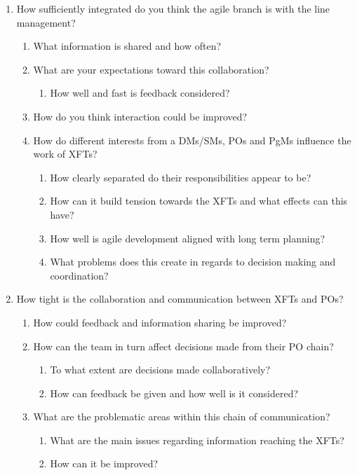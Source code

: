 \begin{enumerate}
  \item How sufficiently integrated do you think the agile branch is with the line management?
  
  \begin{enumerate}
     \item What information is shared and how often?
     \item What are your expectations toward this collaboration?
    
      \begin{enumerate}
       \item How well and fast is feedback considered?
       \end{enumerate}
      
    \item How do you think interaction could be improved?
    \item How do different interests from a DMs/SMs, POs and PgMs influence the work of XFTs?
    
      \begin{enumerate}
       \item How clearly separated do their responsibilities appear to be?
       \item How can it build tension towards the XFTs and what effects can this have?
       \item How well is agile development aligned with long term planning?
       \item What problems does this create in regards to decision making and coordination?
       \end{enumerate}
  \end{enumerate}

  \item How tight is the collaboration and communication between XFTs and POs?
  
  \begin{enumerate}
     \item How could feedback and information sharing be improved?
     \item How can the team in turn affect decisions made from their PO chain?
      
        \begin{enumerate}
         \item To what extent are decisions made collaboratively?
         \item How can feedback be given and how well is it considered?
         \end{enumerate}
     
     \item What are the problematic areas within this chain of communication?
     
        \begin{enumerate}
         \item What are the main issues regarding information reaching the XFTs?
         \item How can it be improved?
         \end{enumerate}
  \end{enumerate}
\end{enumerate}


